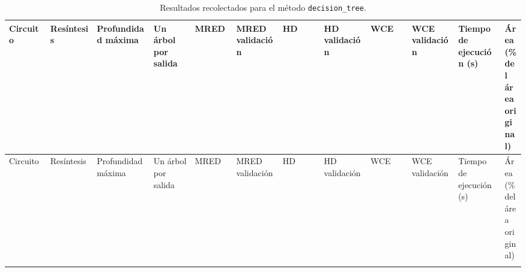 {

  \tabcolsep=3pt
  \centering
  \tiny

  {
  \setlength{\LTleft}{-50pt}
  \setlength{\LTright}{\LTleft}

  \begin{longtable}{M{0.08\linewidth}M{0.09\linewidth}M{0.11\linewidth}M{0.08\linewidth}M{0.08\linewidth}M{0.09\linewidth}M{0.08\linewidth}M{0.09\linewidth}M{0.08\linewidth}M{0.09\linewidth}M{0.09\linewidth}M{0.09\linewidth}}

    \caption{Resultados recolectados para el método \texttt{decision\_tree}.}
    \label{tab:decision_tree_full_results}\\

    \toprule
    Circuito  & Resíntesis & Profundidad máxima & Un árbol por salida & MRED & MRED validación & HD & HD validación & WCE & WCE validación & Tiempo de ejecución (\si{\second}) & Área (\% del área original) \\
    \midrule
    \endfirsthead

    \toprule
    Circuito  & Resíntesis & Profundidad máxima & Un árbol por salida & MRED & MRED validación & HD & HD validación & WCE & WCE validación & Tiempo de ejecución (\si{\second}) & Área (\% del área original) \\
    \midrule
    \endhead

    \midrule
    \endfoot

    \bottomrule
    \endlastfoot


\end{longtable}}}

